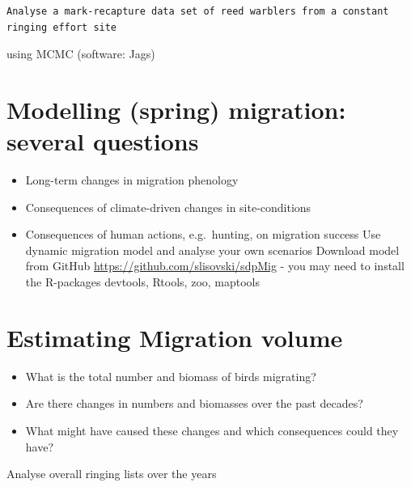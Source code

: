 \documentclass[
]{book}
\providecommand{\tightlist}{%
  \setlength{\itemsep}{0pt}\setlength{\parskip}{0pt}}
\begin{document}
\begin{verbatim}
Analyse a mark-recapture data set of reed warblers from a constant ringing effort site 
\end{verbatim}

using MCMC (software: Jags)

\hypertarget{modelling-spring-migration-several-questions}{%
\section{Modelling (spring) migration: several questions}\label{modelling-spring-migration-several-questions}}

\begin{itemize}
\tightlist
\item
  Long-term changes in migration phenology
\item
  Consequences of climate-driven changes in site-conditions
\item
  Consequences of human actions, e.g.~hunting, on migration success
  Use dynamic migration model and analyse your own scenarios
  Download model from GitHub \url{https://github.com/slisovski/sdpMig} - you may need to install the R-packages devtools, Rtools, zoo, maptools
\end{itemize}

\hypertarget{estimating-migration-volume}{%
\section{Estimating Migration volume}\label{estimating-migration-volume}}

\begin{itemize}
\tightlist
\item
  What is the total number and biomass of birds migrating?
\item
  Are there changes in numbers and biomasses over the past decades?
\item
  What might have caused these changes and which consequences could they have?
\end{itemize}

Analyse overall ringing lists over the years

  
\end{document}
